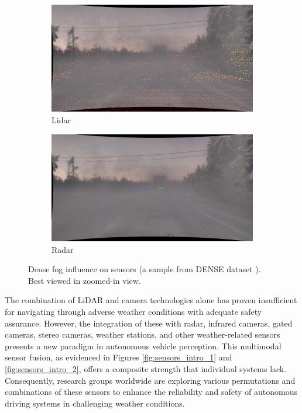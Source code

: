 \documentclass[report.tex]{subfiles}
\begin{document}
\begin{figure}[ht]
        \begin{subfigure}{.5\textwidth}
            \centering
            \includegraphics[width=.9\linewidth]{images/adverse_weather_influence_on_sensor/lidar_1.png}
            \caption{Lidar}
            \label{fig:lidar_in_fog}
        \end{subfigure}%
        \begin{subfigure}{.5\textwidth}
            \centering
            \includegraphics[width=.9\linewidth]{images/adverse_weather_influence_on_sensor/radar_1.png}
            \caption{Radar}
            \label{fig:radar_in_fog}
        \end{subfigure}
        
        \caption{\centering Dense fog influence on sensors (a sample from DENSE dataset \cite{bijelic2020seeing}). Best viewed in zoomed-in view.}
        \label{fig:adverse_weather_influence_on_sensor}
    \end{figure}
    
    The combination of LiDAR and camera technologies alone has proven insufficient for navigating through adverse weather conditions with adequate safety assurance. However, the integration of these with radar, infrared cameras, gated cameras, stereo cameras, weather stations, and other weather-related sensors presents a new paradigm in autonomous vehicle perception. This multimodal sensor fusion, as evidenced in Figures \ref{fig:sensors_intro_1} and \ref{fig:sensors_intro_2}, offers a composite strength that individual systems lack. Consequently, research groups worldwide are exploring various permutations and combinations of these sensors to enhance the reliability and safety of autonomous driving systems in challenging weather conditions.
\end{document}
